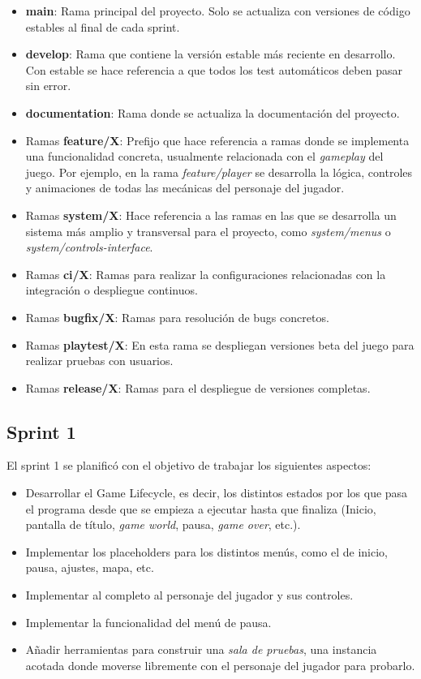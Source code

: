 \begin{itemize}
    \item \textbf{main}: Rama principal del proyecto. Solo se actualiza con versiones de código estables al final de cada sprint.
    \item \textbf{develop}: Rama que contiene la versión estable más reciente en desarrollo. Con estable se hace referencia a que todos los test automáticos deben pasar sin error.
    \item \textbf{documentation}: Rama donde se actualiza la documentación del proyecto.
    \item Ramas \textbf{feature/X}: Prefijo que hace referencia a ramas donde se implementa una funcionalidad concreta, usualmente relacionada con el \textit{gameplay} del juego. Por ejemplo, en la rama \textit{feature/player} se desarrolla la lógica, controles y animaciones de todas las mecánicas del personaje del jugador.
    \item Ramas \textbf{system/X}: Hace referencia a las ramas en las que se desarrolla un sistema más amplio y transversal para el proyecto, como \textit{system/menus} o \textit{system/controls-interface}.
    \item Ramas \textbf{ci/X}: Ramas para realizar la configuraciones relacionadas con la integración o despliegue continuos.
    \item Ramas \textbf{bugfix/X}: Ramas para resolución de bugs concretos.
    \item Ramas \textbf{playtest/X}: En esta rama se despliegan versiones beta del juego para realizar pruebas con usuarios.
    \item Ramas \textbf{release/X}: Ramas para el despliegue de versiones completas.
\end{itemize}

\subsection{Sprint 1}

El sprint 1 se planificó con el objetivo de trabajar los siguientes aspectos:

\begin{itemize}
    \item Desarrollar el Game Lifecycle, es decir, los distintos estados por los que pasa el programa desde que se empieza a ejecutar hasta que finaliza (Inicio, pantalla de título, \textit{game world}, pausa, \textit{game over}, etc.).
    \item Implementar los placeholders para los distintos menús, como el de inicio, pausa, ajustes, mapa, etc.
    \item Implementar al completo al personaje del jugador y sus controles.
    \item Implementar la funcionalidad del menú de pausa.
    \item Añadir herramientas para construir una \textit{sala de pruebas}, una instancia acotada donde moverse libremente con el personaje del jugador para probarlo.
\end{itemize}

